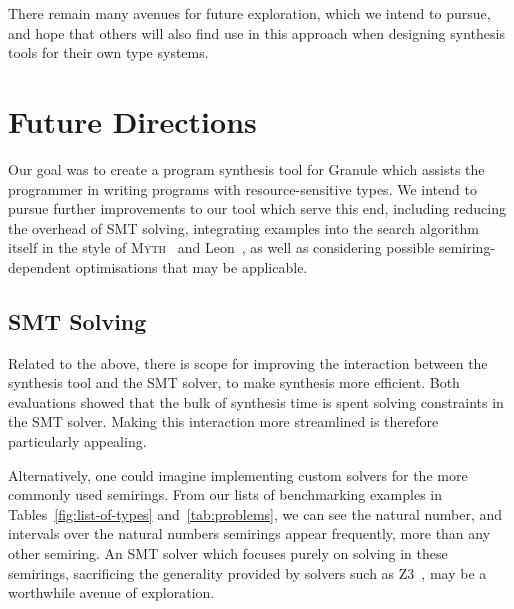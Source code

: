 There remain many avenues for future exploration, which we intend to pursue, and
hope that others will also find use in this approach when designing synthesis
tools for their own type systems. 

\section{Future Directions}
\label{section:future}

Our goal was to create a program synthesis tool for Granule which assists the
programmer in writing programs with resource-sensitive types. We intend to
pursue further improvements to our tool which serve this end, including reducing
the overhead of SMT solving, integrating examples into the search algorithm
itself in the style of \textsc{Myth}~\citep{oseraMYTH1} and
Leon~\citep{10.1145/2509136.2509555}, as well as considering possible
semiring-dependent optimisations that may be applicable.


\subsection{SMT Solving}
Related to the above, there is scope for improving the interaction between the
synthesis tool and the SMT solver, to make synthesis more efficient. Both
evaluations showed that the bulk of synthesis time is spent solving constraints
in the SMT solver. Making this interaction more streamlined is therefore
particularly appealing. 

Alternatively, one could imagine implementing custom solvers for the more
commonly used semirings. From our lists of benchmarking examples in
Tables~\ref{fig:list-of-types} and~\ref{tab:problems}, we can see the natural
number, and intervals over the natural numbers semirings appear frequently, more
than any other semiring. An SMT solver which focuses purely on solving in these
semirings, sacrificing the generality provided by solvers such as Z3~\citep{z3},
may be a worthwhile avenue of exploration. 


